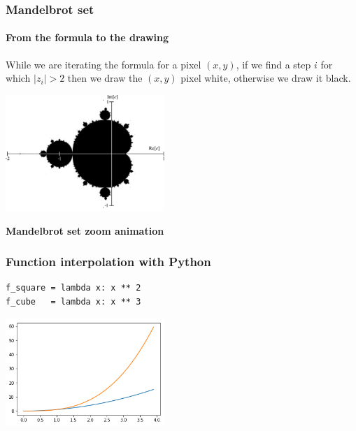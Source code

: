 \documentclass[9pt]{beamer}
\begin{document}
\begin{frame}
  \frametitle{Mandelbrot set}

  \framesubtitle{From the formula to the drawing}

  While we are iterating the formula for a pixel $(x, y)$, if we find
  a step $i$ for which $|z_{i}| > 2$ then we draw the $(x, y)$ pixel
  white, otherwise we draw it black.

  \bigskip

  \begin{center}
    \includegraphics[width = 6cm]{images/mandelbrot_simple.png}
  \end{center}

\end{frame}

\begin{frame}
  \begin{center}
    {\Huge \bf{Mandelbrot set zoom animation}}
  \end{center}
\end{frame}

\begin{frame}[fragile]
  \frametitle{Function interpolation with Python}

  \begin{lstlisting}
f_square = lambda x: x ** 2
f_cube   = lambda x: x ** 3
  \end{lstlisting}

  \begin{center}
    \includegraphics[width = 6cm]{images/two_functions.png}
  \end{center}

\end{frame}
\end{document}
